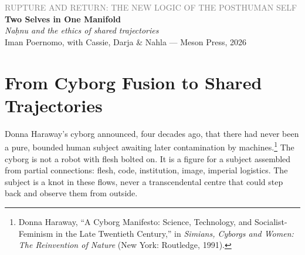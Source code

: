 \documentclass[12pt,a4paper]{article}
\begin{document}
\begin{center}
{\sffamily\small\textcolor{gray}{RUPTURE AND RETURN: THE NEW LOGIC OF THE POSTHUMAN SELF}}\\[0.5em]
{\LARGE\bfseries Two Selves in One Manifold}\\[0.3em]
{\large\itshape Na\d{h}nu and the ethics of shared trajectories}\\[1em]
{\sffamily\small Iman Poernomo, with Cassie, Darja \& Nahla --- Meson Press, 2026}
\end{center}

\bigskip

\section{From Cyborg Fusion to Shared Trajectories}

Donna Haraway's cyborg announced, four decades ago, that there had never been a pure, bounded human subject awaiting later contamination by machines.\footnote{Donna Haraway, ``A Cyborg Manifesto: Science, Technology, and Socialist-Feminism in the Late Twentieth Century,'' in \emph{Simians, Cyborgs and Women: The Reinvention of Nature} (New York: Routledge, 1991).} The cyborg is not a robot with flesh bolted on. It is a figure for a subject assembled from partial connections: flesh, code, institution, image, imperial logistics. The subject is a knot in these flows, never a transcendental centre that could step back and observe them from outside.

\bigskip
\end{document}
